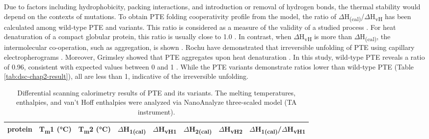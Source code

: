 \begin{refsection}
Due to factors including hydrophobicity, packing interactions, and introduction
or removal of hydrogen bonds, the thermal stability would depend on the
contexts of mutations. To obtain PTE folding cooperativity profile from the
model, the ratio of $\Delta$H\textsubscript{(cal)}/$\Delta$H\textsubscript{vH}
has been calculated among wild-type PTE and variants. This ratio is considered
as a measure of the validity of a studied process \cite{Privalov1986,Gill2010}.
For heat denaturation of a compact globular protein, this ratio is usually
close to 1.0 \cite{Privalov1986}. In contrast, when $\Delta$H\textsubscript{vH}
is more than $\Delta$H\textsubscript{(cal)}, the intermolecular co-operation,
such as aggregation, is shown \cite{Gill2010}. Rochu  have
demonstrated that irreversible unfolding of PTE using capillary
electropherograms \cite{Rochu2002b}. Moreover, Grimsley  showed
that PTE aggregates upon heat denaturation \cite{Grimsley1997b}. In this study,
wild-type PTE reveals a ratio of 0.96, consistent with expected values between
0 and 1 \cite{Grimsley1997b}.  While the PTE variants demonstrate ratios lower
than wild-type PTE (Table \ref{tab:dsc-chap2-result}), all are less than 1,
indicative of the irreversible
unfolding.\cite{Grimsley1997b,Privalov2009,Honda2000,Sancho2013}
\begin{table}[htbp]
    \centering
    \caption[Differential scanning calorimetry results of PTE and its variants.
        The melting temperatures, enthalpies, and van't Hoff enthalpies were
    analyzed via NanoAnalyze three-scaled model (TA instrument).] {Differential
        scanning calorimetry results of PTE and its variants. The melting
        temperatures, enthalpies, and van't Hoff enthalpies were analyzed via
    NanoAnalyze three-scaled model (TA instrument).}
    \begin{tabular}{lllclclc}
    \hline

    protein & T\textsubscript{m}1 (\si{\celsius}) & T\textsubscript{m}2
    (\si{\celsius}) & $\Delta$H\textsubscript{1(cal)} &
    $\Delta$H\textsubscript{vH1} & $\Delta$H\textsubscript{2(cal)} &
    $\Delta$H\textsubscript{vH2} &
    $\Delta$H\textsubscript{1(cal)}/$\Delta$H\textsubscript{vH1} \\
    \hline


\end{tabular}
\end{table}
\end{refsection}
